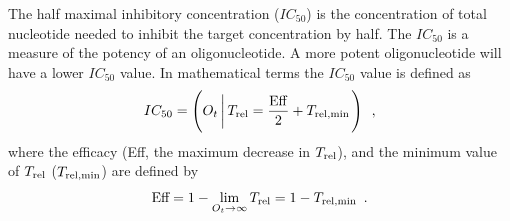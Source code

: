 \documentclass[a4paper,11pt]{article}
\newcommand{\Trel}{T_{\rm{rel}}}
\newcommand{\Trelmin}{T_{\rm{rel,min}}}
\begin{document}
The half maximal inhibitory concentration ($IC_{50}$) is the concentration of total nucleotide needed to inhibit the target concentration by half. The $IC_{50}$ is a measure of the potency of an oligonucleotide. A more potent oligonucleotide will have a lower $IC_{50}$ value. In mathematical terms the $IC_{50}$ value is defined as
\begin{equation}
IC_{50} = \left(O_t \left|\, \Trel = \frac{\mathrm{Eff}}{2}+\Trelmin \right.\right)  \enspace, \label{eq::IC50}
\end{equation}
where the efficacy (Eff, the maximum decrease in $\Trel$), and the minimum value of $\Trel$ ($\Trelmin$) are defined by
\begin{equation}
\textrm{Eff}=1-\lim_{O_t \to \infty} \Trel =1 - \Trelmin \label{eq:Eff} \enspace.
\end{equation}
\end{document}
